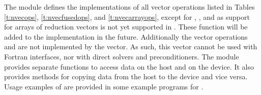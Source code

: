 The {\nvecraja} module defines the implementations of all vector operations listed 
in Tables \ref{t:nvecops}, \ref{t:nvecfusedops}, and \ref{t:nvecarrayops}, except
for , , and
 as support for arrays of reduction vectors is not
yet supported in {\raja}. These function will be added to the {\nvecraja}
implementation in the future. Additionally the vector operations  and
 are not implemented by the {\raja} vector.
As such, this vector cannot be used with {\sundials} Fortran interfaces,
nor with {\sundials} direct solvers and preconditioners.
The {\nvecraja} module provides separate functions to access data on the host
and on the device. It also provides methods for copying data from the host to 
the device and vice versa. Usage examples of {\nvecraja} are provided in
some example programs for {\cvode} \cite{cvode_ex}.

